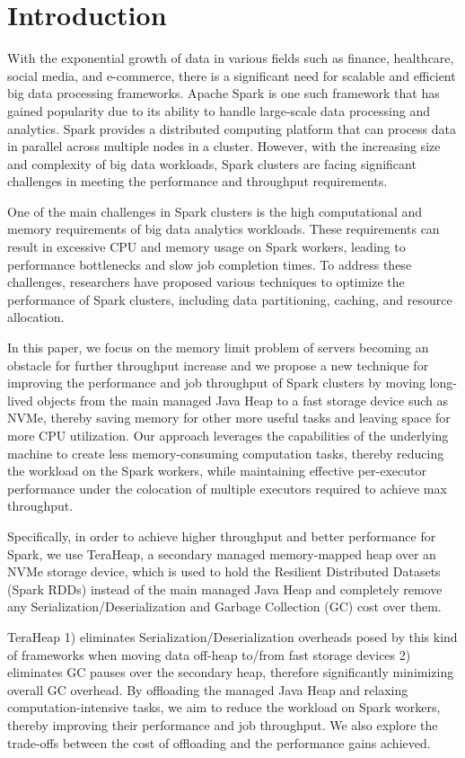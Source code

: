 \section{Introduction}
\label{sec:intro}

With the exponential growth of data in various fields such as finance,
healthcare, social media, and e-commerce, there is a significant need
for scalable and efficient big data processing frameworks. Apache
Spark \cite{Spark} is one such framework that has gained popularity
due to its ability to handle large-scale data processing and
analytics. Spark provides a distributed computing platform that can
process data in parallel across multiple nodes in a cluster. However,
with the increasing size and complexity of big data workloads, Spark
clusters are facing significant challenges in meeting the performance
and throughput requirements.

One of the main challenges in Spark clusters is the high computational
and memory requirements of big data analytics workloads. These
requirements can result in excessive CPU and memory usage on Spark
workers, leading to performance bottlenecks and slow job completion
times. To address these challenges, researchers have proposed various
techniques to optimize the performance of Spark clusters, including
data partitioning, caching, and resource allocation.

In this paper, we focus on the memory limit problem of servers
becoming an obstacle for further throughput increase and we propose a
new technique for improving the performance and job throughput of
Spark clusters by moving long-lived objects from the main managed Java
Heap to a fast storage device such as NVMe, thereby saving memory for
other more useful tasks and leaving space for more CPU utilization.
Our approach leverages the capabilities of the underlying machine to
create less memory-consuming computation tasks, thereby reducing the
workload on the Spark workers, while maintaining effective
per-executor performance under the colocation of multiple executors
required to achieve max throughput.

Specifically, in order to achieve higher throughput and better
performance for Spark, we use TeraHeap, a secondary managed
memory-mapped heap over an NVMe storage device, which is used to hold
the Resilient Distributed Datasets (Spark RDDs) instead of the main
managed Java Heap and completely remove any
Serialization/Deserialization and Garbage Collection (GC) cost over
them.

TeraHeap 1) eliminates Serialization/Deserialization overheads posed
by this kind of frameworks when moving data off-heap to/from fast
storage devices 2) eliminates GC pauses over the secondary heap,
therefore significantly minimizing overall GC overhead. By offloading
the managed Java Heap and relaxing computation-intensive tasks, we aim
to reduce the workload on Spark workers, thereby improving their
performance and job throughput. We also explore the trade-offs between
the cost of offloading and the performance gains achieved.

